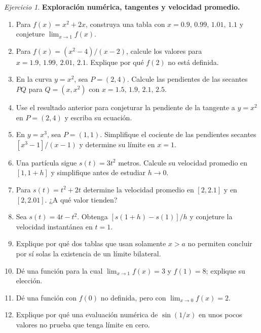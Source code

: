\documentclass[12pt]{article}
\theoremstyle{remark}
\newtheorem{Ejer}{Ejercicio}
\begin{document}
\begin{Ejer}\textbf{Exploración numérica, tangentes y velocidad promedio.}
\begin{enumerate}[resume=banco]
\item Para $f(x)=x^2+2x$, construya una tabla con $x=0.9,\,0.99,\,1.01,\,1.1$ y conjeture $\lim_{x\to1}f(x)$.
\item Para $f(x)=(x^2-4)/(x-2)$, calcule los valores para $x=1.9,\,1.99,\,2.01,\,2.1$. Explique por qué $f(2)$ no está definida.
\item En la curva $y=x^2$, sea $P=(2,4)$. Calcule las pendientes de las secantes $PQ$ para $Q=(x,x^2)$ con $x=1.5,\,1.9,\,2.1,\,2.5$.
\item Use el resultado anterior para conjeturar la pendiente de la tangente a $y=x^2$ en $P=(2,4)$ y escriba su ecuación.
\item En $y=x^3$, sea $P=(1,1)$. Simplifique el cociente de las pendientes secantes $[x^3-1]/(x-1)$ y determine su límite en $x=1$.
\item Una partícula sigue $s(t)=3t^2$ metros. Calcule su velocidad promedio en $[1,1+h]$ y simplifique antes de estudiar $h\to0$.
\item Para $s(t)=t^2+2t$ determine la velocidad promedio en $[2,2.1]$ y en $[2,2.01]$. ¿A qué valor tienden?
\item Sea $s(t)=4t-t^2$. Obtenga $[s(1+h)-s(1)]/h$ y conjeture la velocidad instantánea en $t=1$.
\item Explique por qué dos tablas que usan solamente $x> a$ no permiten concluir por sí solas la existencia de un límite bilateral.
\item Dé una función para la cual $\lim_{x\to1}f(x)=3$ y $f(1)=8$; explique su elección.
\item Dé una función con $f(0)$ no definida, pero con $\lim_{x\to0}f(x)=2$.
\item Explique por qué una evaluación numérica de $\sin(1/x)$ en unos pocos valores no prueba que tenga límite en cero.
\end{enumerate}
\end{Ejer}
\end{document}
